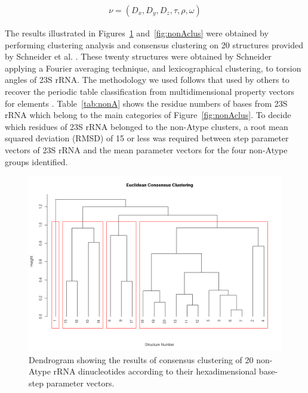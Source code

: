 \begin{gather}
 \nu = (D_x, D_y, D_z, \tau, \rho, \omega)
\end{gather}

The     results      illustrated     in     Figures~\ref{fig:eucl_cons}
and~\ref{fig:nonAclus} were  obtained   by   performing  clustering
analysis  and  consensus  clustering  on  20  structures  provided  by
Schneider et  al.  \cite{schneider2004}. These  twenty structures were
obtained  by  Schneider applying  a  Fourier  averaging technique,  and
lexicographical  clustering,  to  torsion  angles  of  23S  rRNA.   The
methodology  we  used follows  that  used  by  others to  recover  the
periodic table  classification from multidimensional  property vectors
for  elements \cite{restrepo2004,  restrepo2006}. Table~\ref{tab:nonA}
shows the residue  numbers of bases from 23S rRNA  which belong to the
main  categories   of  Figure~\ref{fig:nonAclus}.   To   decide  which
residues of  23S rRNA belonged to  the non-Atype clusters,  a root mean
squared  deviation (RMSD) of  15  or  less  was required  between  step
parameter vectors of  23S rRNA and the mean  parameter vectors for the 
four non-Atype groups identified.

\begin{figure}[htbp]
 \centering
\includegraphics[angle=90, scale=0.6]{Chapter2/eucli_cons_nonA-RNA.png}
\caption{Dendrogram showing the results  of consensus clustering of 20
non-Atype  rRNA  dinucleotides   according  to  their  hexadimensional
base-step parameter vectors.}
 \label{fig:eucl_cons}
\end{figure}

